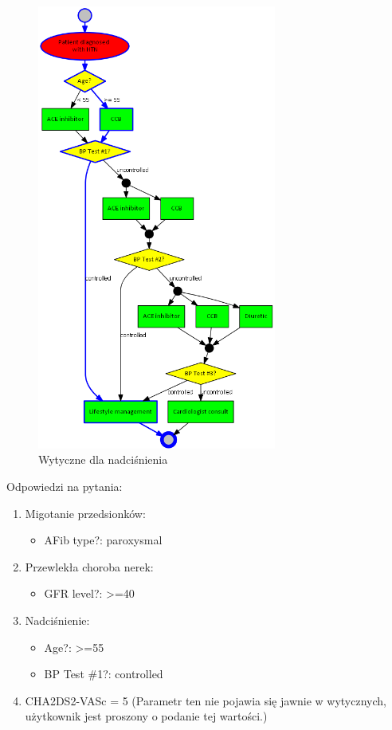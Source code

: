 \begin{figure}[H]
\centering
\includegraphics[width=0.7\textwidth]{img/htn-ver-3.png}
\caption{Wytyczne dla nadciśnienia}
\label{fig:htn}
\end{figure}
\newpage
\noindent Odpowiedzi na pytania:
\begin{enumerate}
\item{Migotanie przedsionków:
	\begin{itemize}
	\item{AFib type?: paroxysmal}
	\end{itemize}
}
\item{Przewlekła choroba nerek:
	\begin{itemize}
	\item{GFR level?: >=40}
	\end{itemize}
}
\item{Nadciśnienie:
	\begin{itemize}
	\item{Age?: >=55}
	\item{BP Test \#1?: controlled}
	\end{itemize}
}
\item{CHA2DS2-VASc = 5 (Parametr ten nie pojawia się jawnie w wytycznych, użytkownik jest proszony o podanie tej wartości.)}
\end{enumerate}
